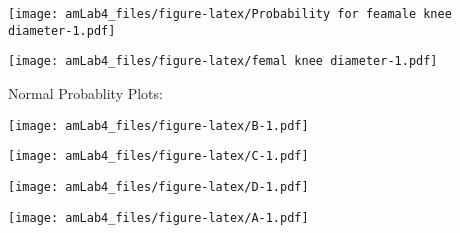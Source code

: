 \documentclass[]{article}
\newenvironment{Shaded}{\begin{snugshade}}{\end{snugshade}}
\newcommand{\KeywordTok}[1]{\textcolor[rgb]{0.13,0.29,0.53}{\textbf{#1}}}
\newcommand{\NormalTok}[1]{#1}
\newcommand{\OperatorTok}[1]{\textcolor[rgb]{0.81,0.36,0.00}{\textbf{#1}}}
\begin{document}
\texttt{[image: amLab4\_files/figure-latex/Probability for feamale knee diameter-1.pdf]}

\begin{Shaded}
\end{Shaded}

\texttt{[image: amLab4\_files/figure-latex/femal knee diameter-1.pdf]}

Normal Probablity Plots:

\begin{Shaded}
\end{Shaded}

\texttt{[image: amLab4\_files/figure-latex/B-1.pdf]}

\begin{Shaded}
\end{Shaded}

\texttt{[image: amLab4\_files/figure-latex/C-1.pdf]}

\begin{Shaded}
\end{Shaded}

\texttt{[image: amLab4\_files/figure-latex/D-1.pdf]}

\begin{Shaded}
\end{Shaded}

\texttt{[image: amLab4\_files/figure-latex/A-1.pdf]}
\end{document}
